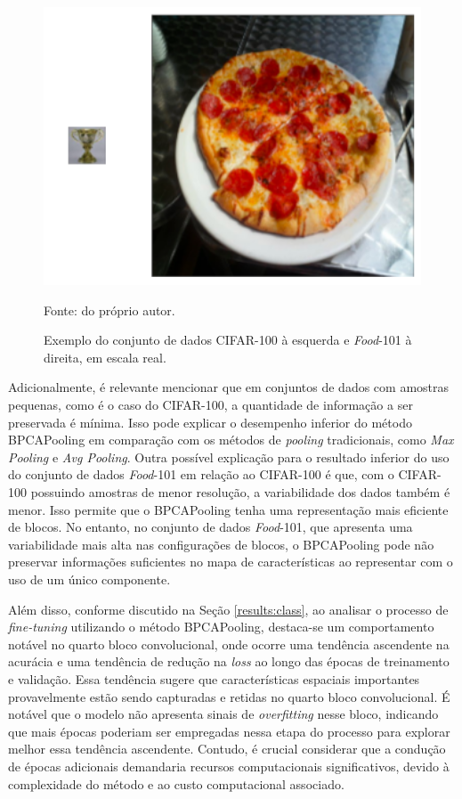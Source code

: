 \begin{figure}[H]
    \centering
    \caption[Comparação dos conjuntos de dados CIFAR-100 e \textit{Food}-101.]{Exemplo do conjunto de dados CIFAR-100 à esquerda e \textit{Food}-101 à direita, em escala real.}
    \label{results:fig:datasets:0}
    \includegraphics[width=1\textwidth]{recursos/imagens/results/dataset_diff.png}

    Fonte: do próprio autor.
\end{figure}


Adicionalmente, é relevante mencionar que em conjuntos de dados com amostras pequenas, como é o caso do CIFAR-100, a quantidade de informação a ser preservada é mínima. Isso pode explicar o desempenho inferior do método BPCAPooling em comparação com os métodos de \textit{pooling} tradicionais, como \textit{Max Pooling} e \textit{Avg Pooling}. Outra possível explicação para o resultado inferior do uso do conjunto de dados \textit{Food}-101 em relação ao CIFAR-100 é que, com o CIFAR-100 possuindo amostras de menor resolução, a variabilidade dos dados também é menor. Isso permite que o BPCAPooling tenha uma representação mais eficiente de blocos. No entanto, no conjunto de dados \textit{Food}-101, que apresenta uma variabilidade mais alta nas configurações de blocos, o BPCAPooling pode não preservar informações suficientes no mapa de características ao representar com o uso de um único componente.

Além disso, conforme discutido na Seção \ref{results:class}, ao analisar o processo de \textit{fine-tuning} utilizando o método BPCAPooling, destaca-se um comportamento notável no quarto bloco convolucional, onde ocorre uma tendência ascendente na acurácia e uma tendência de redução na \textit{loss} ao longo das épocas de treinamento e validação. Essa tendência sugere que características espaciais importantes provavelmente estão sendo capturadas e retidas no quarto bloco convolucional. É notável que o modelo não apresenta sinais de \textit{overfitting} nesse bloco, indicando que mais épocas poderiam ser empregadas nessa etapa do processo para explorar melhor essa tendência ascendente. Contudo, é crucial considerar que a condução de épocas adicionais demandaria recursos computacionais significativos, devido à complexidade do método e ao custo computacional associado.

